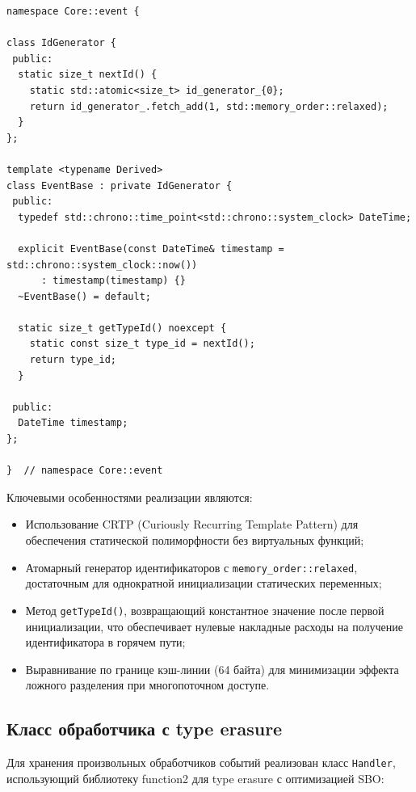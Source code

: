 \documentclass[12pt,a4paper]{report}
\begin{document}
\begin{lstlisting}[caption={Реализация EventBase с генерацией уникальных идентификаторов типов},label=lst:eventbase]
namespace Core::event {

class IdGenerator {
 public:
  static size_t nextId() {
    static std::atomic<size_t> id_generator_{0};
    return id_generator_.fetch_add(1, std::memory_order::relaxed);
  }
};

template <typename Derived>
class EventBase : private IdGenerator {
 public:
  typedef std::chrono::time_point<std::chrono::system_clock> DateTime;

  explicit EventBase(const DateTime& timestamp = std::chrono::system_clock::now())
      : timestamp(timestamp) {}
  ~EventBase() = default;

  static size_t getTypeId() noexcept {
    static const size_t type_id = nextId();
    return type_id;
  }

 public:
  DateTime timestamp;
};

}  // namespace Core::event
\end{lstlisting}

Ключевыми особенностями реализации являются:
\begin{itemize}
    \item Использование CRTP (Curiously Recurring Template Pattern) для обеспечения статической полиморфности без виртуальных функций;
    \item Атомарный генератор идентификаторов с \texttt{memory\_order::relaxed}, достаточным для однократной инициализации статических переменных;
    \item Метод \texttt{getTypeId()}, возвращающий константное значение после первой инициализации, что обеспечивает нулевые накладные расходы на получение идентификатора в горячем пути;
    \item Выравнивание по границе кэш-линии (64 байта) для минимизации эффекта ложного разделения при многопоточном доступе.
\end{itemize}

\subsection{Класс обработчика с type erasure}
Для хранения произвольных обработчиков событий реализован класс \texttt{Handler}, использующий библиотеку function2 для type erasure с оптимизацией SBO:
\end{document}
